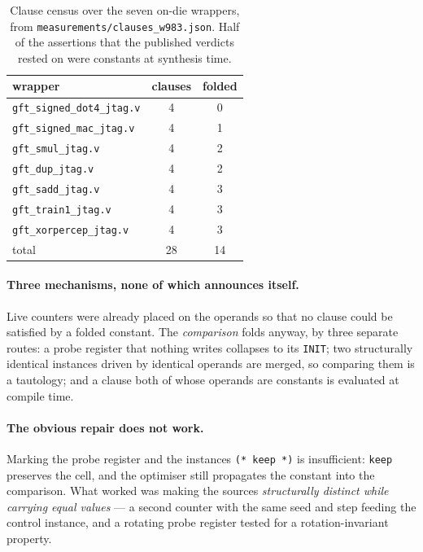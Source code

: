 \begin{table}[htbp]\centering
\begin{tabular}{lcc}
\toprule
wrapper & clauses & folded \\
\midrule
\texttt{gft\_signed\_dot4\_jtag.v} & 4 & 0 \\
\texttt{gft\_signed\_mac\_jtag.v}  & 4 & 1 \\
\texttt{gft\_smul\_jtag.v}         & 4 & 2 \\
\texttt{gft\_dup\_jtag.v}          & 4 & 2 \\
\texttt{gft\_sadd\_jtag.v}         & 4 & 3 \\
\texttt{gft\_train1\_jtag.v}       & 4 & 3 \\
\texttt{gft\_xorpercep\_jtag.v}    & 4 & 3 \\
\midrule
total & 28 & 14 \\
\bottomrule
\end{tabular}
\caption{Clause census over the seven on-die wrappers, from
\texttt{measurements/clauses\_w983.json}. Half of the assertions that the
published verdicts rested on were constants at synthesis time.}
\label{tab:clauses}
\end{table}


\paragraph{Three mechanisms, none of which announces itself.} Live counters were
already placed on the operands so that no clause could be satisfied by a folded
constant. The \emph{comparison} folds anyway, by three separate routes: a probe
register that nothing writes collapses to its \texttt{INIT}; two structurally
identical instances driven by identical operands are merged, so comparing them
is a tautology; and a clause both of whose operands are constants is evaluated
at compile time.

\paragraph{The obvious repair does not work.} Marking the probe register and the
instances \texttt{(* keep *)} is insufficient: \texttt{keep} preserves the cell,
and the optimiser still propagates the constant into the comparison. What worked
was making the sources \emph{structurally distinct while carrying equal values}
--- a second counter with the same seed and step feeding the control instance,
and a rotating probe register tested for a rotation-invariant property.

